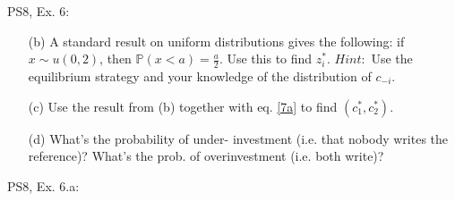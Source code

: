 \begin{frame}{PS8, Ex. 6: }
\begin{multicols}{2}
\begin{itemize}
      \item[(b)] A standard result on uniform distributions gives the following: if $x\sim u(0, 2)$, then $\mathbb{P}(x<a)=\frac{a}{2}$. Use this to find $z_i^*$. $Hint:$ Use the equilibrium strategy and your knowledge of the distribution of $c_{-i}$.
      \item[(c)] Use the result from (b) together with eq. \eqref{7a} to find $(c_1^* , c_2^*)$.
      \item[(d)] What’s the probability of under- investment (i.e. that nobody writes the reference)? What’s the prob. of overinvestment (i.e. both write)?
    \end{itemize}
    \vfill\null
  \end{multicols}
\end{frame}

\begin{frame}{PS8, Ex. 6.a: }
  \begin{multicols}{2}
    \vfill\null\columnbreak
    \vfill\null
  \end{multicols}
\end{frame}
